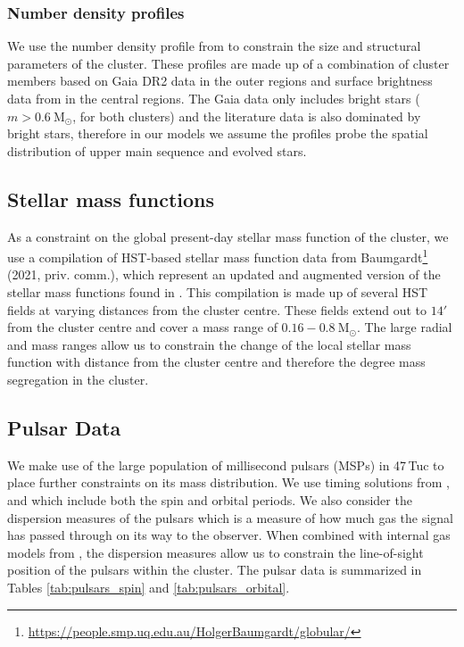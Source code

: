 \subsubsection{Number density profiles}
We use the number density profile from \citet{DeBoer2019} to constrain the size and structural
parameters of the cluster. These profiles are made up of a combination of cluster members based on
Gaia DR2 data in the outer regions and surface brightness data from \citet{Trager1995} in the
central regions. The Gaia data only includes bright stars ($m > 0.6 \ \mathrm{M}_\odot$, for both
clusters) and the literature data is also dominated by bright stars, therefore in our models we
assume the profiles probe the spatial distribution of upper main sequence and evolved stars.


\subsection{Stellar mass functions}
As a constraint on the global present-day stellar mass function of the cluster, we use a compilation
of HST-based stellar mass function data from
Baumgardt\footnote{\url{https://people.smp.uq.edu.au/HolgerBaumgardt/globular/}} (2021, priv.
comm.), which represent an updated and augmented version of the stellar mass functions found in
\citet{Sollima2017}. This compilation is made up of several HST fields at varying distances from the
cluster centre. These fields extend out to $14 '$ from the cluster centre and cover a mass range of
$0.16 - 0.8 \ \mathrm{M}_\odot$. The large radial and mass ranges allow us to constrain the change
of the local stellar mass function with distance from the cluster centre and therefore the degree
mass segregation in the cluster.


\subsection{Pulsar Data}
We make use of the large population of millisecond pulsars (MSPs) in 47\,Tuc to place further
constraints on its mass distribution. We use timing solutions from \citet{Freire2017},
\citet{Ridolfi2016} and \citet{Freire2018} which include both the spin and orbital periods. We also
consider the dispersion measures of the pulsars which is a measure of how much gas the signal has
passed through on its way to the observer. When combined with internal gas models from
\citet{Abbate2018}, the dispersion measures allow us to constrain the line-of-sight position of the
pulsars within the cluster. The pulsar data is summarized in Tables \ref{tab:pulsars_spin} and
\ref{tab:pulsars_orbital}.





